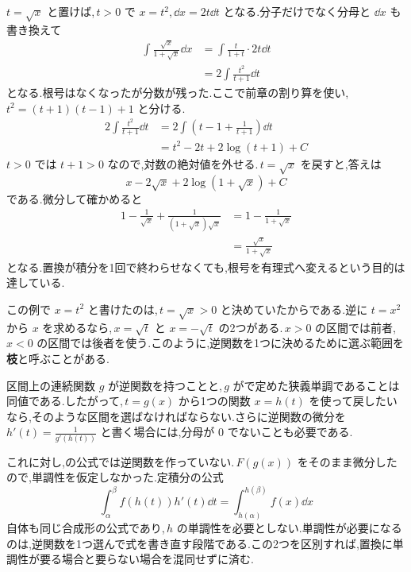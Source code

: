$t=\sqrt{x}$ と置けば,\,$t>0$ で $x=t^2$,\,$\dd x=2t\dd t$ となる.分子だけでなく分母と $\dd x$ も書き換えて
\begin{align*}
 \int\frac{\sqrt{x}}{1+\sqrt{x}}\dd x
 &=\int\frac{t}{1+t}\cdot2t\dd t\\
 &=2\int\frac{t^2}{t+1}\dd t
\end{align*}
となる.根号はなくなったが分数が残った.ここで前章の割り算を使い,\,$t^2=(t+1)(t-1)+1$ と分ける.
\begin{align*}
 2\int\frac{t^2}{t+1}\dd t
 &=2\int\left(t-1+\frac1{t+1}\right)\dd t\\
 &=t^2-2t+2\log(t+1)+C
\end{align*}
$t>0$ では $t+1>0$ なので,対数の絶対値を外せる.\,$t=\sqrt{x}$ を戻すと,答えは
\[
 x-2\sqrt{x}+2\log(1+\sqrt{x})+C
\]
である.微分して確かめると
\begin{align*}
 1-\frac1{\sqrt{x}}+\frac1{(1+\sqrt{x})\sqrt{x}}
 &=1-\frac1{1+\sqrt{x}}\\
 &=\frac{\sqrt{x}}{1+\sqrt{x}}
\end{align*}
となる.置換が積分を1回で終わらせなくても,根号を有理式へ変えるという目的は達している.

この例で $x=t^2$ と書けたのは,\,$t=\sqrt{x}>0$ と決めていたからである.逆に $t=x^2$ から $x$ を求めるなら,\,$x=\sqrt{t}$ と $x=-\sqrt{t}$ の2つがある.\,$x>0$ の区間では前者,\,$x<0$ の区間では後者を使う.このように,逆関数を1つに決めるために選ぶ範囲を\textbf{枝}と呼ぶことがある.

区間上の連続関数 $g$ が逆関数を持つことと,\,$g$ がで定めた狭義単調であることは同値である.したがって,\,$t=g(x)$ から1つの関数 $x=h(t)$ を使って戻したいなら,そのような区間を選ばなければならない.さらに逆関数の微分を $h'(t)=\frac1{g'(h(t))}$ と書く場合には,分母が $0$ でないことも必要である.

これに対し,の公式では逆関数を作っていない.\,$F(g(x))$ をそのまま微分したので,単調性を仮定しなかった.定積分の公式
\[
 \int_\alpha^\beta f(h(t))h'(t)\dd t
 =\int_{h(\alpha)}^{h(\beta)}f(x)\dd x
\]
自体も同じ合成形の公式であり,\,$h$ の単調性を必要としない.単調性が必要になるのは,逆関数を1つ選んで式を書き直す段階である.この2つを区別すれば,置換に単調性が要る場合と要らない場合を混同せずに済む.
